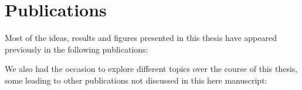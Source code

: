\documentclass[../thesis.tex]{subfiles}
\begin{document}
\chapter*{Publications}

Most of the ideas, results and figures presented in this thesis have appeared previously
in the following publications:
\printbibliography[heading=none,category=thesis_articles]

We also had the occasion to explore different topics over the course of this thesis, some leading to other publications not discussed in this here manuscript:
\nocite{GanicDynamicNoise2020}
\printbibliography[heading=none,category=other_articles]
\end{document}

